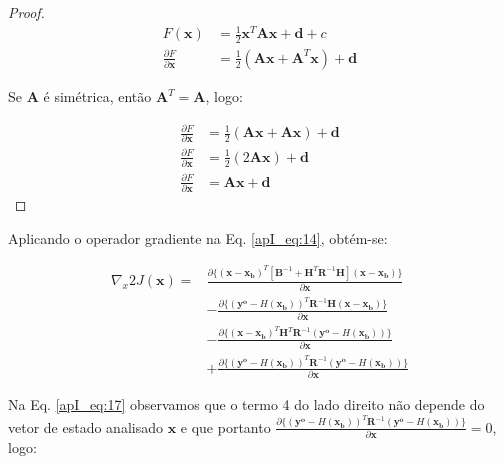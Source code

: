 \begin{proof}
\begin{align*}
    F(\mathbf{x}) &= \frac{1}{2}\mathbf{x}^{T}\mathbf{A}\mathbf{x} + \mathbf{d} + c \\
    \frac{\partial F}{\partial \mathbf{x}} &= \frac{1}{2}(\mathbf{A}\mathbf{x} + \mathbf{A}^{T}\mathbf{x}) + \mathbf{d}
\end{align*}


Se $\mathbf{A}$ é simétrica, então $\mathbf{A}^{T} = \mathbf{A}$, logo:

\begin{align*}
    \frac{\partial F}{\partial \mathbf{x}} &= \frac{1}{2}(\mathbf{A}\mathbf{x} + \mathbf{A}\mathbf{x}) + \mathbf{d} \\
    \frac{\partial F}{\partial \mathbf{x}} &= \frac{1}{2}(2\mathbf{A}\mathbf{x}) + \mathbf{d} \\
    \frac{\partial F}{\partial \mathbf{x}} &= \mathbf{A}\mathbf{x} + \mathbf{d}
\end{align*}
\end{proof}

Aplicando o operador gradiente na Eq. \ref{apI_eq:14}, obtém-se:

\begin{equation}
  \label{apI_eq:17}
  \begin{aligned}
    \nabla_{x}{2J(\mathbf{x})} = {} &\frac{\partial \lbrace(\mathbf{x} - \mathbf{x_{b}})^{T}[\mathbf{B}^{-1} + \mathbf{H}^{T}\mathbf{R}^{-1}\mathbf{H}](\mathbf{x} - \mathbf{x_{b}})\rbrace}{\partial \mathbf{x}} \\
                & - \frac{\partial \lbrace(\mathbf{y^{o}} - \textit{H}(\mathbf{x_{b}}))^{T}\mathbf{R}^{-1}\mathbf{H}(\mathbf{x} - \mathbf{x_{b}})\rbrace}{\partial \mathbf{x}} \\
                & - \frac{\partial \lbrace(\mathbf{x} - \mathbf{x_{b}})^{T}\mathbf{H}^{T}\mathbf{R}^{-1}(\mathbf{y^{o}} - \textit{H}(\mathbf{x_{b}}))\rbrace}{\partial \mathbf{x}} \\
                & + \frac{\partial \lbrace(\mathbf{y^{o}} - \textit{H}(\mathbf{x_{b}}))^{T}\mathbf{R}^{-1}(\mathbf{y^{o}} - \textit{H}(\mathbf{x_{b}}))\rbrace}{\partial \mathbf{x}}
  \end{aligned}  
\end{equation}

Na Eq. \ref{apI_eq:17} observamos que o termo 4 do lado direito não depende do vetor de estado analisado $\mathbf{x}$ e que portanto $\frac{\partial \lbrace(\mathbf{y^{o}} - \textit{H}(\mathbf{x_{b}}))^{T}\mathbf{R}^{-1}(\mathbf{y^{o}} - \textit{H}(\mathbf{x_{b}}))\rbrace}{\partial \mathbf{x}} = 0$, logo:

